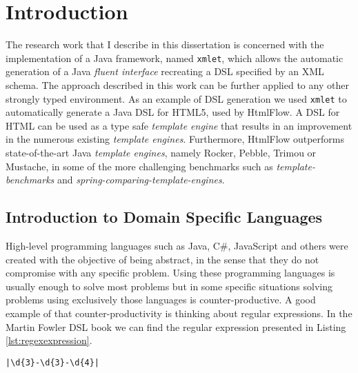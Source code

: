 \chapter{Introduction}
\label{cha:introduction}

\sloppy

The research work that I describe in this dissertation is concerned with the implementation of a Java framework, named \texttt{xmlet}, which allows the automatic generation of a Java \textit{fluent interface}\cite{fluentinterface} recreating a \ac{DSL}\cite{dsl} specified by an \ac{XML} schema. The approach described in this work can be further applied to any other strongly typed environment. As an example of \ac{DSL} generation we used \texttt{xmlet} to automatically generate a Java \ac{DSL} for \ac{HTML}5, used by HtmlFlow\cite{htmlflow}. A \ac{DSL} for \ac{HTML} can be used as a type safe \textit{template engine} that results in an improvement in the numerous existing \textit{template engines}. Furthermore, HtmlFlow outperforms state-of-the-art Java \textit{template engines}, namely Rocker\cite{rocker}, Pebble\cite{pebble}, Trimou\cite{trimou} or Mustache\cite{mustache}, in some of the more challenging benchmarks such as \textit{template-benchmarks}\cite{templatebenchmark} and \textit{spring-comparing-template-engines}\cite{springbenchmark}.

\section{Introduction to Domain Specific Languages}


High-level programming languages such as Java, C\#, JavaScript and others were created with the objective of being abstract, in the sense that they do not compromise with any specific problem. Using these programming languages is usually enough to solve most problems but in some specific situations solving problems using exclusively those languages is counter-productive. A good example of that counter-productivity is thinking about regular expressions. In the Martin Fowler \ac{DSL} book\cite{dslbook} we can find the regular expression presented in Listing \ref{lst:regexexpression}.

\bigskip

\begin{minipage}{\linewidth}
\begin{lstlisting}[caption={Regular Expression Example}, label={lst:regexexpression}, style=dynamicviewsex]
|\d{3}-\d{3}-\d{4}|
\end{lstlisting}
\end{minipage} 

